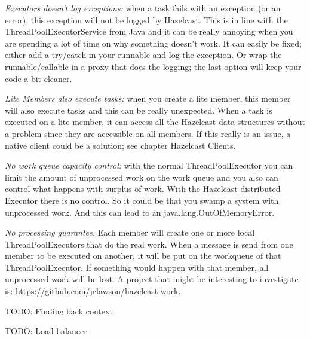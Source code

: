 \emph{Executors doesn't log exceptions:} when a task fails with an exception (or an error), this exception will not be logged by Hazelcast. This is in line with the ThreadPoolExecutorService from Java and it can be really annoying when you are spending a lot of time on why something doesn't work. It can easily be fixed; either add a try/catch in your runnable and log the exception. Or wrap the runnable/callable in a proxy that does the logging; the last option will keep your code a bit cleaner. 

\emph{Lite Members also execute tasks:} when you create a lite member, this member will also execute tasks and this can be really unexpected. When a task is executed on a lite member, it can access all the Hazelcast data structures without a problem since they are accessible on all members. If this really is an issue, a native client could be a solution; see chapter Hazelcast Clients.

\emph{No work queue capacity control:} with the normal ThreadPoolExecutor you can limit the amount of unprocessed work on the work queue and you also can control what happens with surplus of work. With the Hazelcast distributed Executor there is no control. So it could be that you swamp a system with unprocessed work. And this can lead to an java.lang.OutOfMemoryError.

\emph{No processing guarantee.} Each member will create one or more local ThreadPoolExecutors that do the real work. When a message is send from one member to be executed on another, it will be put on the workqueue of that ThreadPoolExecutor. If something would happen with that member, all unprocessed work will be lost. A project that might be interesting to investigate is: https://github.com/jclawson/hazelcast-work.

TODO: Finding back context

TODO: Load balancer

